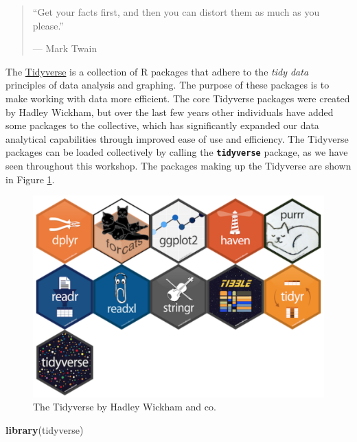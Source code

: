 \documentclass[]{book}
\newenvironment{Shaded}{\begin{snugshade}}{\end{snugshade}}
\newcommand{\KeywordTok}[1]{\textcolor[rgb]{0.13,0.29,0.53}{\textbf{#1}}}
\newcommand{\NormalTok}[1]{#1}
\theoremstyle{definition}
\theoremstyle{definition}
\theoremstyle{definition}
\theoremstyle{remark}
\begin{document}
\begin{quote}
``Get your facts first, and then you can distort them as much as you
please.''

--- Mark Twain
\end{quote}

The \href{http://tidyverse.org}{Tidyverse} is a collection of R packages
that adhere to the \emph{tidy data} principles of data analysis and
graphing. The purpose of these packages is to make working with data
more efficient. The core Tidyverse packages were created by Hadley
Wickham, but over the last few years other individuals have added some
packages to the collective, which has significantly expanded our data
analytical capabilities through improved ease of use and efficiency. The
Tidyverse packages can be loaded collectively by calling the
\textbf{\texttt{tidyverse}} package, as we have seen throughout this
workshop. The packages making up the Tidyverse are shown in Figure
\ref{fig:tidyverse}.

\begin{figure}

{\centering \includegraphics[width=1\linewidth]{figures/tidyverse} 

}

\caption{The Tidyverse by Hadley Wickham and co.}\label{fig:tidyverse}
\end{figure}

\begin{Shaded}
\begin{Highlighting}[]
\KeywordTok{library}\NormalTok{(tidyverse)}
\end{Highlighting}
\end{Shaded}
\end{document}
